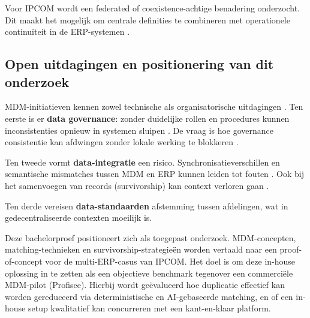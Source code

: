 Voor IPCOM wordt een federated of coexistence-achtige benadering onderzocht. Dit maakt het mogelijk om centrale definities te combineren met operationele continuïteit in de ERP-systemen \autocite{Rengasamy2025}.

\subsection{Open uitdagingen en positionering van dit onderzoek}
MDM-initiatieven kennen zowel technische als organisatorische uitdagingen \autocite{Pansara2021}.
Ten eerste is er \textbf{data governance}: zonder duidelijke rollen en procedures kunnen inconsistenties opnieuw in systemen sluipen \autocite{Pansara2021}. De vraag is hoe governance consistentie kan afdwingen zonder lokale werking te blokkeren \autocite{VilminkoHeikkinenPekkola2019}.

Ten tweede vormt \textbf{data-integratie} een risico. Synchronisatieverschillen en semantische mismatches tussen MDM en ERP kunnen leiden tot fouten \autocite{Maedche2010}. Ook bij het samenvoegen van records (survivorship) kan context verloren gaan \autocite{Pansara2021}.

Ten derde vereisen \textbf{data-standaarden} afstemming tussen afdelingen, wat in gedecentraliseerde contexten moeilijk is.

Deze bachelorproef positioneert zich als toegepast onderzoek. MDM-concepten, matching-technieken en survivorship-strategieën worden vertaald naar een proof-of-concept voor de multi-ERP-casus van IPCOM. Het doel is om deze in-house oplossing in te zetten als een objectieve benchmark tegenover een commerciële MDM-pilot (Profisee). Hierbij wordt geëvalueerd hoe duplicatie effectief kan worden gereduceerd via deterministische en AI-gebaseerde matching, en of een in-house setup kwalitatief kan concurreren met een kant-en-klaar platform.
